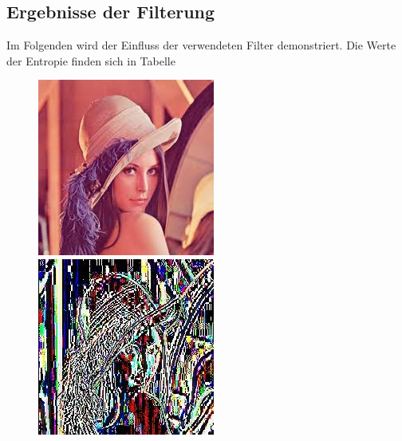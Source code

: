 \documentclass[a4paper,12pt]{article}
\begin{document}
\subsection{Ergebnisse der Filterung}
Im Folgenden wird der Einfluss der verwendeten Filter demonstriert. Die Werte der Entropie finden sich in Tabelle
\par
\begin{figure}[h]
    \centering
\begin{minipage}[h]{.45\linewidth}
\centering
\includegraphics[width=0.55\linewidth]{preconditioning/lena}
\end{minipage}
\hfill
\begin{minipage}[h]{.45\linewidth}
\centering
\includegraphics[width=0.55\linewidth]{preconditioning/lena_sub}
\end{minipage}
\end{figure}
\end{document}
